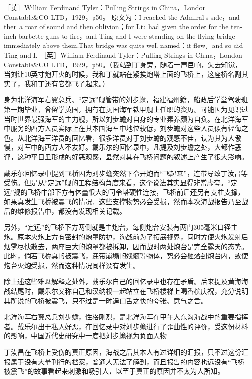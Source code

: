 \documentclass[12pt,UTF8]{ctexbook}
\begin{document}
［英］William Ferdinand Tyler：Pulling Strings in China，London Constable\&CO LTD，1929，p50。
原文为：I reached the Admiral’s side，and then a roar of sound and then oblivion；for Liu had given the order for the ten-inch barbette guns to fire，and Ting and I were standing on the flying-bridge immediately above them.That bridge was quite well named：it flew，and so did Ting and I. ［英］William Ferdinand Tyler：Pulling Strings in China，London Constable\&CO LTD，1929，p50。（我站到丁身旁，随着一声巨响，失去知觉，当刘让10英寸炮开火的时候，我和丁就站在紧挨炮塔上面的飞桥上，这座桥名副其实了，我和丁还有它都飞了起来。）

身为北洋海军右翼总兵、“定远”舰管带的刘步蟾，福建福州籍，船政后学堂驾驶班第一期毕业，曾留学英国，拥有在英国海军铁甲舰上任职的资历。可能因为见识过当时世界最强海军的主力舰，所以刘步蟾对自身的专业素养颇为自负。在北洋海军中服务的西方人员实际上在其本国海军中地位较低，刘步蟾对这些人员似有轻侮之色。从北洋海军洋员的回忆看，很多洋员对于刘步蟾的观感不佳，认为其为人傲慢，对军中的西方人不友好。戴乐尔的回忆录中，凡提及刘步蟾之处，大都作恶评，这种平日里形成的好恶观感，显然对其在飞桥问题的叙述上产生了很大影响。

戴乐尔回忆录中提到飞桥因为刘步蟾突然下令开炮而“飞起来”，连带导致丁汝昌等受伤。但是从“定远”舰的工程结构角度来看，这个说法其实显得非常虚夸。“定远”舰的飞桥中部下方有体量很大的司令塔硬性连接，飞桥前后还另有支柱支撑，如果真发生飞桥被震飞的情况，这些支撑物势必会受损，然而本次海战报告乃至战后的维修报告中，都没有发现相关记载。

另外，“定远”的飞桥下方两侧就是主炮台，每侧炮台安装有两门305毫米口径主炮。原本火炮上方有密封的炮罩防护，海战前为了拓展视界，同时方便火炮发射后烟雾尽快散去，两座巨大的炮罩都被拆卸，因而战时两处炮台是完全露天的态势。此时，倘若飞桥真的被震飞，连带崩塌的残骸等物体，势必会砸落到炮台内，致使炮台火炮受损，然而这种情况同样没有发生。

除上述这些难以解释之处外，戴乐尔自己的回忆录中也存在矛盾。后来提及黄海海战结尾时，戴乐尔又称自己和汉纳根一起站立在飞桥楼梯上喝香槟庆祝，充分说明其所说的飞桥被震飞，只不过是一时逞口舌之快的夸张、意气之言。


北洋海军右翼总兵刘步蟾，性格刚烈，是北洋海军在甲午大东沟海战中的重要指挥者。戴乐尔出于私人好恶，在回忆录中对刘步蟾进行了歪曲性的评价，受这份材料的影响，中国近代史研究中一度把刘步蟾视为负面人物

丁汝昌在飞桥上受伤的真正原因，海战之后其本人有过详细的汇报，只不过这份汇报属于没有大量刊行的档案，普通人无法了解到，而且报告的内容也远没有“飞桥被震飞”的故事看起来刺激和吸引人，以至于真正的原因并不太为人所知。
\end{document}
